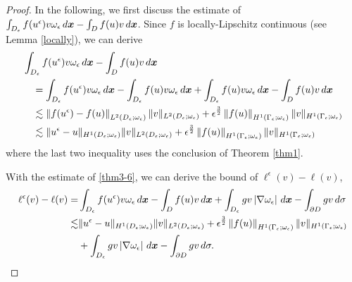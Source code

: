 \documentclass[10pt,a4paper]{amsart}
\newcommand{\dd}{\,{\rm d}}
\begin{document}
\begin{proof}
	In the following, we first discuss the estimate of $\int_{D_{\epsilon}}f(u^{\epsilon})v\omega_{\epsilon}\dd\bm x-\int_D f(u)v\dd\bm x$. Since $f$ is locally-Lipschitz continuous (see Lemma \ref{locally}), we can derive
	\begin{equation}
		\label{thm3-6}
		\begin{aligned}
			&\int_{D_{\epsilon}} f(u^{\epsilon})v\omega_{\epsilon}\dd\bm x - \int_D f(u)v\dd\bm x\\
			&\quad=\int_{D_{\epsilon}} f(u^{\epsilon})v\omega_{\epsilon}\dd\bm x-\int_{D_{\epsilon}} f(u)v\omega_{\epsilon}\dd\bm x+\int_{D_{\epsilon}}f(u)v\omega_{\epsilon}\dd\bm x-\int_D f(u)v\dd\bm x\\
			&\quad\lesssim \left\|f(u^{\epsilon})-f(u)\right\|_{L^2(D_{\epsilon};\omega_{\epsilon})}\|v\|_{L^2(D_{\epsilon};\omega_{\epsilon})}+\epsilon^{\frac 3 2}\left\|f(u)\right\|_{H^1(\Gamma_{\epsilon};\omega_{\epsilon})}\|v\|_{H^1(\Gamma_{\epsilon};\omega_{\epsilon})}\\
			&\quad\lesssim\|u^{\epsilon}-u\|_{H^1(D_{\epsilon};\omega_{\epsilon})}\|v\|_{L^2(D_{\epsilon};\omega_{\epsilon})}+\epsilon^{\frac 3 2}\left\|f(u)\right\|_{H^1(\Gamma_{\epsilon};\omega_{\epsilon})}\|v\|_{H^1(\Gamma_{\epsilon};\omega_{\epsilon})}
		\end{aligned}
	\end{equation}
	where the last two inequality uses the conclusion of Theorem \ref{thm1}.
	
	With the estimate of \eqref{thm3-6}, we can derive the bound of $\ell^{\epsilon}(v)-\ell(v)$, 
	\begin{equation}
		\label{thm3-7}
		\begin{aligned}
			\ell^{\epsilon}(v)-\ell(v)=& \int_{D_{\epsilon}}f(u^{\epsilon})v\omega_{\epsilon}\dd \bm x-\int_D f(u)v\dd \bm x+\int_{D_{\epsilon}}gv\left|\nabla\omega_{\epsilon}\right|\dd \bm x-\int_{\partial D}gv\dd \sigma\\
			\lesssim& \|u^{\epsilon}-u\|_{H^1(D_{\epsilon};\omega_{\epsilon})}\|v\|_{L^2(D_{\epsilon};\omega_{\epsilon})}+\epsilon^{\frac 3 2}\left\|f(u)\right\|_{H^1(\Gamma_{\epsilon};\omega_{\epsilon})}\|v\|_{H^1(\Gamma_{\epsilon};\omega_{\epsilon})}\\
			&+\int_{D_{\epsilon}} gv\left|\nabla\omega_{\epsilon}\right|\dd \bm x-\int_{\partial D}gv\dd \sigma.
		\end{aligned}
	\end{equation}
	

\end{proof}
\end{document}
